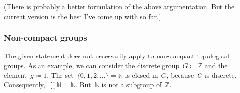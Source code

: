 (There is probably a better formulation of the above argumentation.
But the current version is the best I’ve come up with so far.)



\subsubsection*{Non-compact groups}

The given statement does not necessarily apply to non-compact topological groups.
As an example, we can consider the discrete group~$G ≔ ℤ$ and the element~$g ≔ 1$.
The set~$\{ 0, 1, 2, \dotsc \} = ℕ$ is closed in~$G$, because~$G$ is discrete.
Consequently,~$\closure{ℕ} = ℕ$.
But~$ℕ$ is not a subgroup of~$ℤ$.

